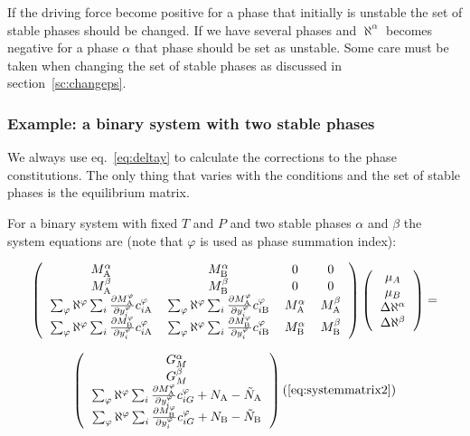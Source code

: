 \documentclass[12pt]{article}
\begin{document}
If the driving force become positive for a phase that initially is
unstable the set of stable phases should be changed.  If we have
several phases and $\aleph^{\alpha}$ becomes negative for a phase
$\alpha$ that phase should be set as unstable.  Some care must be
taken when changing the set of stable phases as discussed in
section~\ref{sc:changeps}.

\subsubsection{Example: a binary system with two stable phases}

We always use eq.~\ref{eq:deltay} to calculate the corrections to the
phase constitutions.  The only thing that varies with the conditions
and the set of stable phases is the equilibrium matrix.

For a binary system with fixed $T$ and $P$ and two stable phases
$\alpha$ and $\beta$ the system equations are (note that $\varphi$ is
used as phase summation index):


\label{eq:systemmatrix2}

\[
\left(
\begin{tabular}{cccc}
$M^{\alpha}_{\rm A}$ & $M^{\alpha}_{\rm B}$ & 0  & 0 \\
$M^{\beta}_{\rm A}$ & $M^{\beta}_{\rm B}$ & 0  & 0 \\
$\sum_{\varphi}\aleph^{\varphi}
\sum_i \frac{\partial M^{\varphi}_{\rm A}}{\partial y_i^{\varphi}}
c^{\varphi}_{i{\rm A}}$ &
$\sum_{\varphi}\aleph^{\varphi}
\sum_i \frac{\partial M^{\varphi}_{\rm A}}{\partial y_i^{\varphi}}
c^{\varphi}_{i{\rm B}}$ &
$M^{\alpha}_{\rm A}$ & $M^{\beta}_{\rm A}$ \\
$\sum_{\varphi}\aleph^{\varphi}
\sum_i \frac{\partial M^{\varphi}_{\rm B}}{\partial y_i^{\varphi}}
c^{\varphi}_{i{\rm A}}$ &
$\sum_{\varphi}\aleph^{\varphi}
\sum_i \frac{\partial M^{\varphi}_{\rm B}}{\partial y_i^{\varphi}}
c^{\varphi}_{i{\rm B}}$ &
$M^{\alpha}_{\rm B}$ & $M^{\beta}_{\rm B}$ \\
\end{tabular}
\right)
\left(
\begin{tabular}{c}
$\mu_A$\\
$\mu_B$\\
$\Delta \aleph^{\alpha}$\\
$\Delta \aleph^{\beta}$
\end{tabular}
\right)
=\]

\[
\left(
\begin{tabular}{c}
$G_M^{\alpha}$\\
$G_M^{\beta}$\\
$\sum_{\varphi}\aleph^{\varphi} \sum_i \frac{\partial M^{\varphi}_{\rm A}}{\partial y_i^{\varphi}} c^{\varphi}_{iG}+N_{\rm A}-\tilde N_{\rm A}$\\
$\sum_{\varphi}\aleph^{\varphi} \sum_i 
\frac{\partial M^{\varphi}_{\rm B}}{\partial y_i^{\varphi}} c^{\varphi}_{iG}+N_{\rm B}-\tilde N_{\rm B}$\\
\end{tabular}
\right)
\\ (\ref{eq:systemmatrix2})
\]
\end{document}
